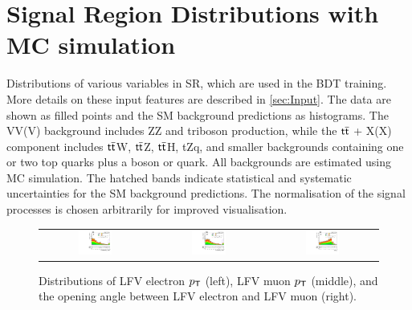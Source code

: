\chapter{Signal Region Distributions with MC simulation}
\label{chap:SRMC}

Distributions of various variables in \ac{SR}, which are used in the \ac{BDT} training. More details on these input features are described in \autoref{sec:Input}. The data are shown as filled points and the \ac{SM} background predictions as histograms. The VV(V) background includes ZZ and triboson production, while the $\textsf{t}\overline{\textsf{t}}$ + X(X) component includes $\textsf{t}\overline{\textsf{t}}$W, $\textsf{t}\overline{\textsf{t}}$Z, $\textsf{t}\overline{\textsf{t}}$H, tZq, and smaller backgrounds containing one or two top quarks plus a boson or quark. All backgrounds are estimated using \ac{MC} simulation. The hatched bands indicate statistical and systematic uncertainties for the \ac{SM} background predictions. The normalisation of the signal processes is chosen arbitrarily for improved visualisation. 

\begin{figure}[tbh!]
 \begin{center}
 \begin{tabular}{ccc}
    \includegraphics[width=0.325\textwidth]{figures/Appendix/SRMC/LFVePt}&
    \includegraphics[width=0.325\textwidth]{figures/Appendix/SRMC/LFVmuPt}&
    \includegraphics[width=0.325\textwidth]{figures/Appendix/SRMC/llDr}\\
 \end{tabular}
 \caption{Distributions of LFV electron $p_{\textsf{T}}$ (left), LFV muon $p_{\textsf{T}}$ (middle), and the opening angle between LFV electron and LFV muon (right).}
 \label{fig:input_vali_1}
 \end{center}
\end{figure}

